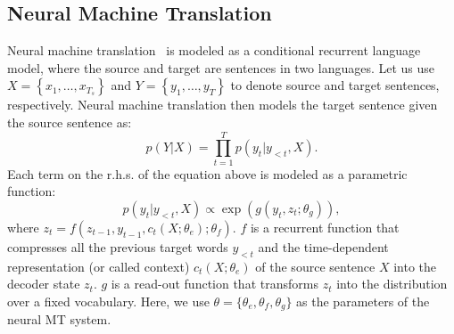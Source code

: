 \documentclass[11pt,letterpaper]{article}
\begin{document}
\subsection{Neural Machine Translation}
Neural machine translation~\cite{sutskever2014sequence,bahdanau2014neural} is modeled as a conditional recurrent language model, where the source and target are sentences in two languages. Let us use $X=\left\{ x_1, \ldots, x_{T_s} \right\}$ and $Y=\left\{ y_1, \ldots, y_T \right\}$ to denote source and target sentences, respectively. Neural machine translation then models the target sentence given the source sentence as:
\begin{equation}
p(Y|X) = \prod_{t=1}^T p(y_t | y_{<t}, X).
\end{equation}
Each term on the r.h.s. of the equation above is modeled as a parametric function:
\begin{equation}
\label{eq.prob}
p(y_t|y_{<t}, X)\propto \exp\left(g\left(y_t, z_t; \theta_g\right)\right),
\end{equation}
where 
$z_t = f(z_{t-1}, y_{t-1}, c_t(X; \theta_e); \theta_f)$.
$f$ is a recurrent function that compresses all the previous target words $y_{<t}$ and the time-dependent representation (or called context) $c_t(X; \theta_e)$ of the source sentence $X$ into the decoder state $z_t$. $g$ is a read-out function that transforms $z_t$ into the distribution over a fixed vocabulary.  Here, we use $\theta = \{\theta_e, \theta_f, \theta_g\}$ as the parameters of the neural MT system.
\end{document}
